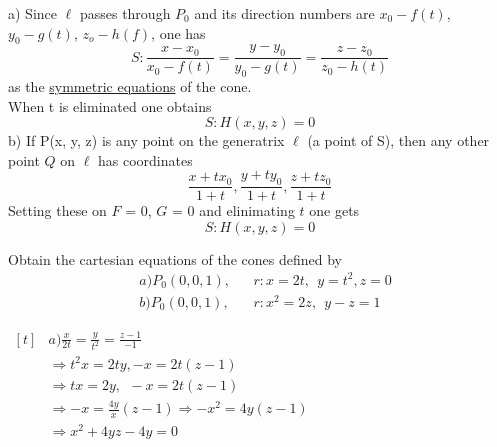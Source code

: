 \documentclass[11pt]{amsbook}
\begin{document}
	\begin{hSolution}
		\indent a) Since $\ell$ passes through $P_0$ and its direction numbers are $x_0 - f(t)$, $y_0 - g(t)$, $z_o - h(f)$, one has
		\begin{equation*}
		    S: \frac{x-x_0}{x_0 - f(t)} = \frac{y - y_0}{y_0 - g(t)} = \frac{z - z_0}{z_0 - h(t)}
		\end{equation*}
		as the \underline{symmetric equations} of the cone.\\
		\indent When t is eliminated one obtains 
		\begin{equation*}
		    S : H(x, y, z) = 0		  
		\end{equation*}
		\indent b) If P(x, y, z) is any point on the generatrix $\ell$ (a point of S), then any other point $Q$ on $\ell$ has coordinates 
		$$ \frac{x + tx_0}{1 + t} , \frac{y + ty_0}{1 + t} , \frac{z + tz_0}{1 + t}$$
		Setting these on $F$ = 0, $G$ = 0 and elinimating $t$ one gets 
		\begin{equation*}
		    S: H(x, y, z) = 0
		\end{equation*}
	\end{hSolution}
	\begin{exmp}
	    Obtain the cartesian equations of the cones defined by 
	    \begin{align*}
	        &a) P_0(0, 0, 1),   &&r: x = 2t, \ \  y=t^2 , z=0\\
	        &b) P_0(0, 0, 1),   &&r: x^2 = 2z,\ \  y-z = 1
	    \end{align*}
	\end{exmp}
	
	\begin{hSolution}
	    $\begin{aligned}[t]
	         &a)   \frac{x}{2t} = \frac{y}{t^2} = \frac{z-1}{-1}\\
            &\Rightarrow t^2x = 2ty,   -x = 2t(z-1) \\ &\Rightarrow tx = 2y, \ \  -x = 2t(z-1)\\
            &\Rightarrow -x = \frac{4y}{x} (z-1) \Rightarrow -x^2 = 4y(z-1)\\
            &\Rightarrow x^2 + 4yz -4y = 0
        \end{aligned}$

	\end{hSolution}
\end{document}
